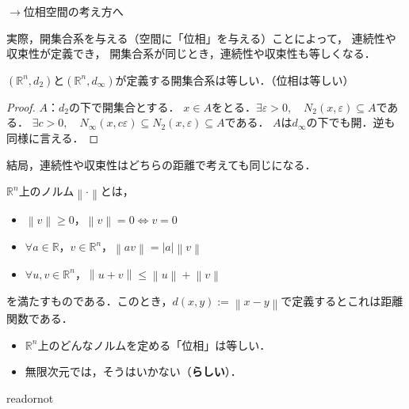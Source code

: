 \documentclass[uplatex]{jsarticle}
\begin{document}
$\longrightarrow$位相空間の考え方へ

実際，開集合系を与える（空間に「位相」を与える）ことによって，
連続性や収束性が定義でき，
開集合系が同じとき，連続性や収束性も等しくなる．

\begin{rei}
    $(\mathbb{R}^{n},d_{2})$と$(\mathbb{R}^{n},d_{\infty})$が定義する開集合系は等しい．（位相は等しい）
    \begin{proof}
        $A$：$d_{2}$の下で開集合とする．
        $x \in A$をとる．$\exists \varepsilon > 0, \quad N_{2}(x,\varepsilon) \subseteq A$である．
        $\exists c > 0, \quad N_{\infty} (x, c \varepsilon) \subseteq N_{2} (x, \varepsilon) \subseteq A$である．
        $A$は$d_{\infty}$の下でも開．逆も同様に言える． 
    \end{proof}
    結局，連続性や収束性はどちらの距離で考えても同じになる．
\end{rei}

\begin{rei}
    $\mathbb{R}^{n}$上のノルム$\left\| \cdot \right\|$とは，
    \begin{itemize}
        \vspace{-0.5\baselineskip}
        \item $\left\| v \right\| \ge 0$，\qquad $\left\| v \right\| = 0 \Longleftrightarrow v = 0$
        \item $\forall a \in \mathbb{R}$，$v \in \mathbb{R}^{n}$，$\left\| av \right\| = \left| a \right| \left\| v \right\|$
        \item $\forall u,v \in \mathbb{R}^{n}$，$\left\| u + v \right\| \le \left\| u \right\| + \left\| v \right\|$
        \vspace{-0.5\baselineskip}
    \end{itemize}
    を満たすものである．このとき，$d(x,y) := \left\| x - y \right\|$で定義するとこれは距離関数である．
\end{rei}

\begin{itemize}
    \vspace{-0.5\baselineskip}
    \item $\mathbb{R}^{n}$上のどんなノルムを定める「位相」は等しい．
    \item 無限次元では，そうはいかない（\textbf{らしい}）．
\end{itemize}

\expandafter\ifx\csname readornot\endcsname\relax
  
\end{document}
